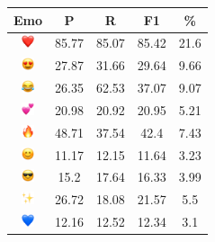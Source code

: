 \documentclass{article}
\begin{document}
\begin{table}
\centering
\begin{tabular}{|c|ccc|c|} \hline
\textbf{Emo} & \textbf{P} & \textbf{R} & \textbf{F1} & \textbf{\%} \\ \hline
\includegraphics[height=0.37cm,width=0.37cm]{img/red_heart.png} & 85.77 & 85.07 & 85.42 & 21.6\\ 
\includegraphics[height=0.37cm,width=0.37cm]{img/smiling_face_with_hearteyes.png} & 27.87 & 31.66 & 29.64 & 9.66\\ 
\includegraphics[height=0.37cm,width=0.37cm]{img/face_with_tears_of_joy.png} & 26.35 & 62.53 & 37.07 & 9.07\\ 
\includegraphics[height=0.37cm,width=0.37cm]{img/two_hearts.png} & 20.98 & 20.92 & 20.95 & 5.21\\ 
\includegraphics[height=0.37cm,width=0.37cm]{img/fire.png} & 48.71 & 37.54 & 42.4 & 7.43\\ 
\includegraphics[height=0.37cm,width=0.37cm]{img/smiling_face_with_smiling_eyes.png} & 11.17 & 12.15 & 11.64 & 3.23\\ 
\includegraphics[height=0.37cm,width=0.37cm]{img/smiling_face_with_sunglasses.png} & 15.2 & 17.64 & 16.33 & 3.99\\ 
\includegraphics[height=0.37cm,width=0.37cm]{img/sparkles.png} & 26.72 & 18.08 & 21.57 & 5.5\\ 
\includegraphics[height=0.37cm,width=0.37cm]{img/blue_heart.png} & 12.16 & 12.52 & 12.34 & 3.1\\ 

\end{tabular}
\end{table}
\end{document}
